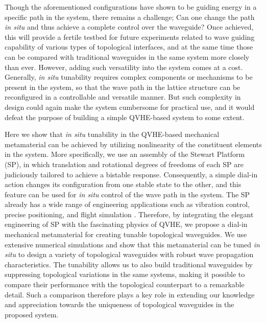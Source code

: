 \documentclass[aps,preprint,onecolumn,showpacs,superscriptaddress,groupedaddress]{revtex4}  %
\begin{document}
Though the aforementioned configurations have shown to be guiding energy in a specific path in the system, there remains a challenge{; Can} one change the path \textit{in situ} and thus achieve a complete control over the waveguide? Once achieved, this will provide a fertile testbed for future experiments related to wave guiding capability of various types of topological interfaces, and at the same time those can be compared with traditional waveguides in the same system more closely than ever. However, adding such versatility into the system comes at a cost. Generally, \textit{in situ} tunability requires complex components or mechanisms to be present in the system, so that the wave path in the lattice structure can be reconfigured in a controllable and versatile manner. But such complexity in design could again make the system cumbersome for practical use, and it would defeat the purpose of building a simple QVHE-based system to some extent. 

Here we show that \textit{in situ} tunability in the QVHE-based mechanical metamaterial can be achieved by utilizing nonlinearity of the constituent elements in the system. More specifically, we use an assembly of the Stewart Platform (SP), in which translation and rotational degrees of freedoms of each SP are judiciously tailored to achieve a bistable response. Consequently, a simple dial-in action changes its configuration from one stable state to the other, and this feature can be used for \textit{in situ} control of the wave path in the system. The SP already has a wide range of engineering applications such as vibration control, precise positioning, and flight simulation \citep{41,42}. Therefore, by integrating the elegant engineering of SP with the fascinating physics of QVHE, we propose a dial-in mechanical metamaterial for creating tunable topological waveguides. We use extensive numerical simulations and show that this metamaterial can be tuned \textit{in situ} to design a variety of topological waveguides with robust wave propagation characteristics. The tunability allows us to also build traditional waveguides by suppressing topological variations in the same systems, making it possible to compare their performance with the topological counterpart to a remarkable detail. Such a comparison therefore plays a key role in extending our knowledge and appreciation towards the uniqueness of topological waveguides in the proposed system. 
\end{document}
